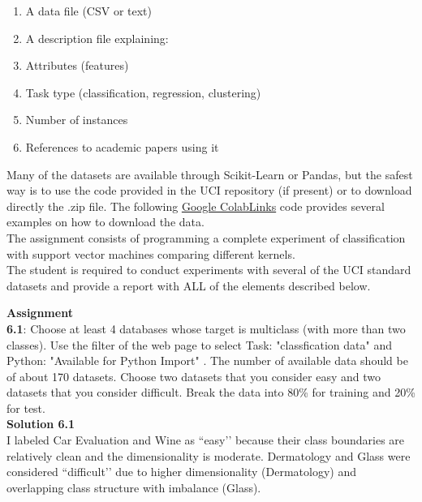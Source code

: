 \documentclass[11pt]{article}
\begin{document}
	\begin{enumerate}
		\item A data file (CSV or text)
		\item A description file explaining:
		\item Attributes (features)
		\item Task type (classification, regression, clustering)
		\item Number of instances
		\item References to academic papers using it
	\end{enumerate}
	
	Many of the datasets are available through Scikit-Learn or Pandas, but the safest way is to use the code provided in the UCI repository (if present) or to download directly the .zip file. The following \href{https://colab.research.google.com/drive/1hCmSUcDQMuZe9SrMs0qRkfnQa-BRbqKw?usp=sharing}{Google ColabLinks} code provides several examples on how to download the data.\\
	
	The assignment consists of programming a complete experiment of classification with support vector machines comparing different kernels.\\
	
	The student is required to conduct experiments with several of the UCI standard datasets and provide a report with ALL of the elements described below. 
	
	\newpage
	\textbf{Assignment}\\
	
	\textbf{6.1}: Choose at least 4 databases whose target is multiclass (with more than two classes). Use the filter of the web page to select Task: "classfication data" and Python: "Available for Python Import" . The number of available data should be of about 170 datasets. Choose two datasets that you consider easy and two datasets that you consider difficult. Break the data into 80\% for training and 20\% for test.\\
	
	\noindent\textbf{Solution 6.1}\\
	
	I labeled Car Evaluation and Wine as ``easy’’ because their class boundaries are relatively clean and the dimensionality is moderate. Dermatology and Glass were considered ``difficult’’ due to higher dimensionality (Dermatology) and overlapping class structure with imbalance (Glass).
	
\end{document}
